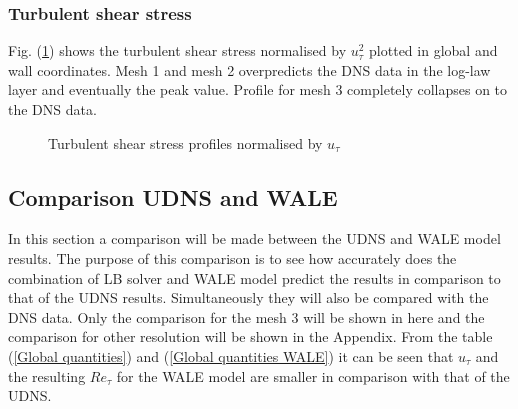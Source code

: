 \subsubsection{Turbulent shear stress}
Fig. (\ref{uvrms wale}) shows the turbulent shear stress normalised by $u_\tau^2$ plotted in global and wall coordinates. Mesh 1 and mesh 2 overpredicts the DNS data in the log-law layer and eventually the peak value. Profile for mesh 3 completely collapses on to the DNS data.
%
\begin{figure}[h!]
\begin{minipage}[b]{0.5\textwidth}
\end{minipage}
%
\begin{minipage}[b]{0.5\textwidth}
\end{minipage}
\caption{Turbulent shear stress profiles normalised by $u_\tau$}
\label{uvrms wale}
\end{figure}

\subsection{Comparison UDNS and WALE}

In this section a comparison will be made between the UDNS and WALE model results. The purpose of this comparison is to see how accurately does the combination of LB solver and WALE model predict the results in comparison to that of the UDNS results. Simultaneously they will also be compared with the DNS data. Only the comparison for the mesh 3 will be shown in here and the comparison for other resolution will be shown in the Appendix. From the table (\ref{Global quantities}) and (\ref{Global quantities WALE}) it can be seen that $u_\tau$ and the resulting $Re_\tau$ for the WALE model are smaller in comparison with that of the UDNS.

